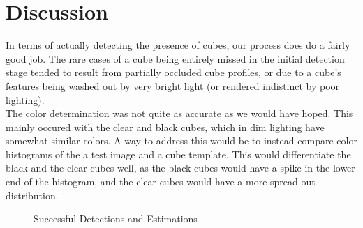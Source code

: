 \documentclass[conference]{IEEEtran}
\begin{document}
\section{Discussion}
In terms of actually detecting the presence of cubes, our process does do a fairly good job.  The rare cases of a cube being entirely missed in the initial detection stage tended to result from partially occluded cube profiles, or due to a cube's features being washed out by very bright light (or rendered indistinct by poor lighting).\\

The color determination was not quite as accurate as we would have hoped.  This mainly occured with the clear and black cubes, which in dim lighting have somewhat similar colors.  A way to address this would be to instead compare color histograms of the a test image and a cube template.  This would differentiate the black and the clear cubes well, as the black cubes would have a spike in the lower end of the histogram, and the clear cubes would have a more spread out distribution.\\

\begin{figure}[!t]
\centerline{
\label{fig_first_case}
\hfil
{}}
\caption{Successful Detections and Estimations}
\label{fig_sim}
\end{figure}
\end{document}
